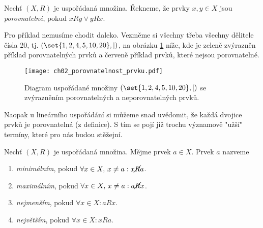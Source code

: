 \begin{definition}\label{def:porovnatelnost}
    Nechť $(X,R)$ je uspořádaná množina. Řekneme, že prvky $x,y\in X$ jsou \emph{porovnatelné}, pokud $xRy \lor yRx$.
\end{definition}
Pro příklad nemusíme chodit daleko. Vezměme si všechny třeba všechny dělitele čísla 20, tj. $(\set{1,2,4,5,10,20},\mid)$, na obrázku \ref{fig:porovnatelnost_prvku} níže, kde je zeleně zvýrazněn příklad porovnatelných prvků a červeně příklad prvků, které nejsou porovnatelné.
\begin{figure}[H]
    \centering
    \texttt{[image: ch02\_porovnatelnost\_prvku.pdf]}
    \caption{Diagram uspořádané množiny $(\set{1,2,4,5,10,20},\mid)$ se zvýrazněním porovnatelných a neporovnatelných prvků.}
    \label{fig:porovnatelnost_prvku}
\end{figure}
Naopak u lineárního uspořádání si můžeme snad uvědomit, že každá dvojice prvků je porovnatelná (z definice). S tím se pojí již trochu významově "užší" termíny, které pro nás budou stěžejní.
\begin{definition}
    Nechť $(X,R)$ je uspořádaná množina. Mějme prvek $a\in X$. Prvek $a$ nazveme
    \begin{enumerate}[label=(\roman*)]
        \item \emph{minimálním}, pokud $\forall x\in X,\,x\neq a: x\cancel{R}a$.
        \item \emph{maximálním}, pokud $\forall x\in X,\,x\neq a: a\cancel{R}x$.
        \item \emph{nejmenším}, pokud $\forall x\in X: aRx$.
        \item \emph{největším}, pokud $\forall x\in X: xRa$.
    \end{enumerate}
\end{definition}
